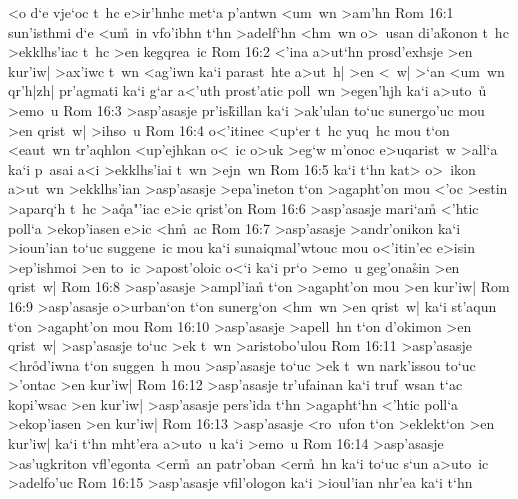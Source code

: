 <o
d`e
vje`oc
t~hc
e>ir'hnhc
met`a
p'antwn
<um~wn
>am'hn\bibvsend
\vs Rom 16:1
sun'isthmi
d`e
<u\r{m}~in
vfo'ibhn
t`hn
>adelf`hn
<hm~wn
o>~usan
di\-'a\r{k}o\-non
t~hc
>ekklhs'iac
t~hc
>en
kegqrea~ic\bibvsend
\vs Rom 16:2
<'ina
a>ut`hn
prosd'exhsje
>en
kur'iw|
>ax'iwc
t~wn
<ag'iwn
ka`i
parast~hte
a>ut~h|
>en
<~w|
>`an
<um~wn
qr'h|zh|
pr'agmati
ka`i
g`ar
a<'uth
prost'atic
poll~wn
>egen'hjh
ka`i
a>uto~u\r{}
>emo~u\bibvsend
\vs Rom 16:3
>asp'asasje
pr'is\r{k}illan
ka`i
>ak'ulan
to`uc
sunergo'uc
mou
>en
qrist~w|
>ihso~u\bibvsend
\vs Rom 16:4
o<'itinec
<up`er
t~hc
yuq~hc
mou
t`on
<eaut~wn
tr'aqhlon
<up'ejhkan
o<~ic
o>uk
>eg`w
m'onoc
e>uqarist~w
>all`a
ka`i
p~asai
a<i
>ekklhs'iai
t~wn
>ejn~wn\bibvsend
\vs Rom 16:5
ka`i
t`hn
kat>
o>~ikon
a>ut~wn
>ekklhs'ian
>asp'asasje
>epa'ineton
t`on
>agapht'on
mou
<'oc
>estin
>aparq`h
t~hc
>a\r{q}a"'iac
e>ic
qrist'on\bibvsend
\vs Rom 16:6
>asp'asasje
mari`a\r{m}
<'htic
poll`a
>ekop'iasen
e>ic
<h\r{m}~ac\bibvsend
{}
\vs Rom 16:7
>asp'asasje
>andr'onikon
ka`i
>ioun'ian
to`uc
suggene~ic
mou
ka`i
sunaiqmal'wtouc
mou
o<'itin'ec
e>isin
>ep'ishmoi
>en
to~ic
>apost'oloic
o<`i
ka`i
pr`o
>emo~u
geg'ona\r{s}in
>en
qrist~w|\bibvsend
\vs Rom 16:8
>asp'asasje
>ampl'ia\r{n}
t`on
>agapht'on
mou
>en
kur'iw|\bibvsend
\vs Rom 16:9
>asp'asasje
o>urban`on
t`on
sunerg`on
<hm~wn
>en
qrist~w|
ka`i
st'aqun
t`on
>agapht'on
mou\bibvsend
\vs Rom 16:10
>asp'asasje
>apell~hn
t`on
d'okimon
>en
qrist~w|
>asp'asasje
to`uc
>ek
t~wn
>aristobo'ulou\bibvsend
\vs Rom 16:11
>asp'asasje
<hr\r{o}d'iwna
t`on
suggen~h
mou
>asp'asasje
to`uc
>ek
t~wn
nark'issou
to`uc
>'ontac
>en
kur'iw|\bibvsend
\vs Rom 16:12
>asp'asasje
tr'ufainan
ka`i
truf~wsan
t`ac
kopi'wsac
>en
kur'iw|
>asp'asasje
pers'ida
t`hn
>agapht`hn
<'htic
poll`a
>ekop'iasen
>en
kur'iw|\bibvsend
\vs Rom 16:13
>asp'asasje
<ro~ufon
t`on
>eklekt`on
>en
kur'iw|
ka`i
t`hn
mht'era
a>uto~u
ka`i
>emo~u\bibvsend
\vs Rom 16:14
>asp'asasje
>as'ugkriton
vfl'egonta
<er\r{m}~an
patr'oban
<er\r{m}~hn
ka`i
to`uc
s`un
a>uto~ic
>adelfo'uc\bibvsend
\vs Rom 16:15
>asp'asasje
vfil'ologon
ka`i
>ioul'ian
nhr'ea
ka`i
t`hn
